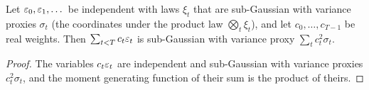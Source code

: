 \begin{lemma}
  \label{lem:weighted_noise_subgaussian}
  \leanok
  Let $\varepsilon_0, \varepsilon_1, \dots$ be independent with laws $\xi_t$ that are sub-Gaussian with variance
  proxies $\sigma_t$ (the coordinates under the product law $\bigotimes_t \xi_t$), and let
  $c_0, \dots, c_{T-1}$ be real weights. Then $\sum_{t < T} c_t \varepsilon_t$ is sub-Gaussian with
  variance proxy $\sum_t c_t^2 \sigma_t$.
\end{lemma}

\begin{proof}
  \leanok
  The variables $c_t \varepsilon_t$ are independent and sub-Gaussian with variance proxies
  $c_t^2 \sigma_t$, and the moment generating function of their sum is the product of theirs.
\end{proof}
